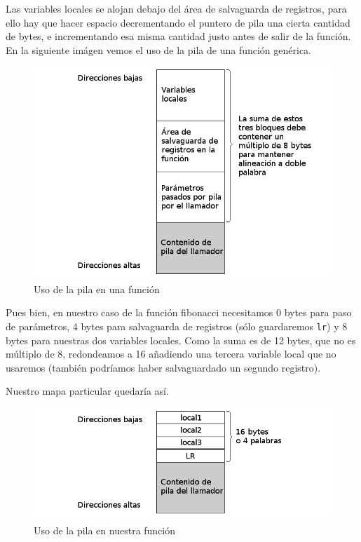 Las variables locales se alojan debajo del área de salvaguarda de registros, para ello hay que
hacer espacio decrementando el puntero de pila una cierta cantidad de bytes, e incrementando esa
misma cantidad justo antes de salir de la función. En la siguiente imágen vemos el uso de la pila
de una función genérica.

\begin{figure}[h]
  \centering
    \includegraphics[width=14cm]{graphs/pila.png}
  \caption{Uso de la pila en una función}
  \label{fig:pila}
\end{figure}

Pues bien, en nuestro caso de la función fibonacci necesitamos 0 bytes para paso de parámetros,
4 bytes para salvaguarda de registros (sólo guardaremos {\tt lr}) y 8 bytes para nuestras
dos variables locales. Como la suma es de 12 bytes, que no es múltiplo de 8, redondeamos a 16
añadiendo una tercera variable local que no usaremos (también podríamos haber salvaguardado un
segundo registro).

Nuestro mapa particular quedaría así.

\begin{figure}[h]
  \centering
    \includegraphics[width=14cm]{graphs/pila2.png}
  \caption{Uso de la pila en nuestra función}
  \label{fig:pila2}
\end{figure}

